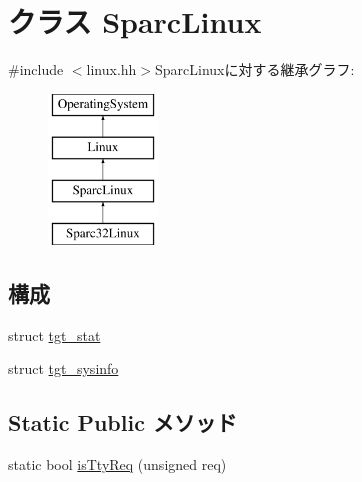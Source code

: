 \hypertarget{classSparcLinux}{
\section{クラス SparcLinux}
\label{classSparcLinux}
}


{\ttfamily \#include $<$linux.hh$>$}SparcLinuxに対する継承グラフ:\begin{figure}[H]
\begin{center}
\leavevmode
\includegraphics[height=4cm]{classSparcLinux}
\end{center}
\end{figure}
\subsection*{構成}
\begin{DoxyCompactItemize}
\item 
struct \hyperlink{structSparcLinux_1_1tgt__stat}{tgt\_\-stat}
\item 
struct \hyperlink{structSparcLinux_1_1tgt__sysinfo}{tgt\_\-sysinfo}
\end{DoxyCompactItemize}
\subsection*{Static Public メソッド}
\begin{DoxyCompactItemize}
\item 
static bool \hyperlink{classSparcLinux_ab20bdd4422ecf6e1736a5587be296b3f}{isTtyReq} (unsigned req)
\end{DoxyCompactItemize}
